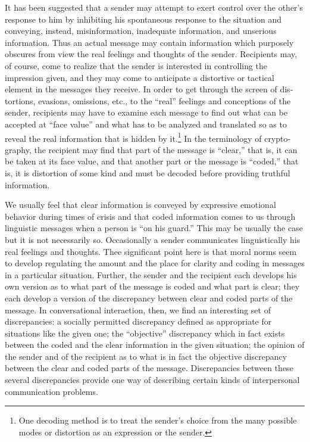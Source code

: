 \documentclass[twoside,symmetric,nobib,justified]{tufte-book}
\begin{document}
It has been suggested that a sender may attempt to exert control over
the other's response to him by inhibiting his spontaneous response to
the situation and conveying, instead, misinformation, inadequate
information, and unserious information. Thus an actual message may
contain information which purposely obscures from view the real feelings
and thoughts of the sender. Recipients may, of course, come to realize
that the sender is interested in controlling the impression given, and
they may come to anticipate a distortive or tactical element in the
mes­sages they receive. In order to get through the screen of
dis­tortions, evasions, omissions, etc., to the ``real'' feelings and
conceptions of the sender, recipients may have to examine each message
to find out what can be accepted at ``face value'' and what has to be
analyzed and translated so as to reveal the real information that is
hidden by it.\footnote{One decoding method is to treat the sender's
  choice from the many possible modes or distortion as an expression or
  the sender.} In the terminology of crypto­graphy, the recipient may
find that part of the message is ``clear,'' that is, it can be taken at
its face value, and that another part or the message is ``coded,'' that
is, it is distor­tion of some kind and must be decoded before providing
truthful information.

We usually feel that clear information is conveyed by expressive
emotional behavior during times of crisis and that coded information
comes to us through linguistic messages when a person is ``on his
guard.'' This may be usually the case but it is not necessarily so.
Occasionally a sender communicates linguistically his real feelings and
thoughts. Thee significant point here is that moral norms seem to
develop regulating the amount and the place for clarity and coding in
messages in a particular situation. Further, the sender and the
recipient each develops his own version as to what part of the message
is coded and what part is clear; they each develop a version of the
discrepancy between clear and coded parts of the message. In
con­versational interaction, then, we find an interesting set of
discrepancies: a socially permitted discrepancy defined as ap­propriate
for situations like the given one; the ``objective'' discrepancy which
in fact exists between the coded and the clear information in the given
situation; the opinion of the sender and of the recipient as to what is
in fact the objective discrepancy between the clear and coded parts of
the message. Discrepancies between these several discrepancies provide
one way of describing certain kinds of interpersonal communication
problems.
\end{document}
